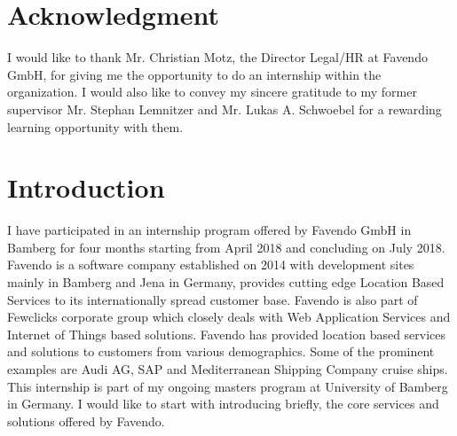 \section{Acknowledgment}
I would like to thank Mr. Christian Motz, the Director Legal/HR at Favendo GmbH, for giving me the opportunity to do an internship within the organization. I would also like to convey my sincere gratitude to my former supervisor Mr. Stephan Lemnitzer and Mr. Lukas A. Schwoebel for a rewarding learning opportunity with them.

\section{Introduction}
I have participated in an internship program offered by Favendo GmbH \cite{favendoataglance} in Bamberg for four months starting from April 2018 and concluding on July 2018. Favendo is a software company established on 2014 with development sites mainly in Bamberg and Jena in Germany, provides cutting edge Location Based Services to its internationally spread customer base. Favendo is also part of Fewclicks corporate group \cite{fewclicksataglance} which closely deals with Web Application Services and Internet of Things based solutions. Favendo has provided location based services and solutions to customers from various demographics. Some of the prominent examples are Audi AG, SAP and Mediterranean Shipping Company cruise ships. This internship is part of my ongoing masters program at University of Bamberg in Germany. I would like to start with introducing briefly, the core services and solutions offered by Favendo.

